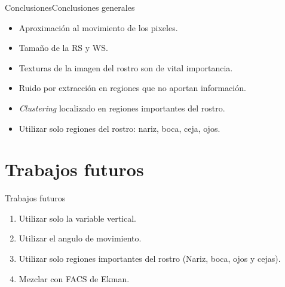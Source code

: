 \documentclass{beamer}
\begin{document}
	\begin{frame}{Conclusiones}{Conclusiones generales}
		\begin{itemize}
			\item Aproximación al movimiento de los pixeles.
			\item Tamaño de la RS y WS.
			\item Texturas de la imagen del rostro son de vital importancia.
			\item Ruido por extracción en regiones que no aportan información.
			\item \textit{Clustering} localizado en regiones importantes del rostro.
			\item Utilizar solo regiones del rostro: nariz, boca, ceja, ojos.
			
		\end{itemize}
	\end{frame}      

\section{Trabajos futuros}
        \begin{frame}{Trabajos futuros}{}
			\begin{enumerate}
				\item Utilizar solo la variable vertical.
				\item Utilizar el angulo de movimiento.
				\item Utilizar solo regiones importantes del rostro (Nariz, boca, ojos y cejas).
				\item Mezclar con FACS de Ekman.
			\end{enumerate}					        
        \end{frame}
    

\end{document}
